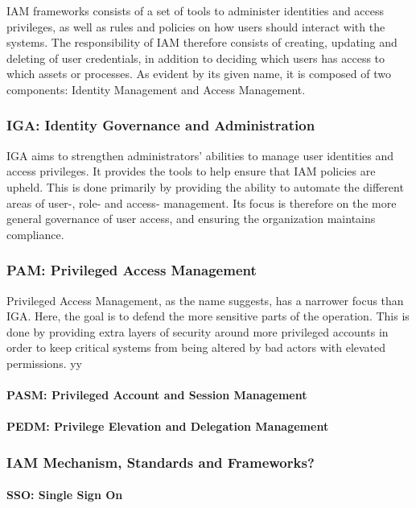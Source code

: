 IAM frameworks consists of a set of tools to administer identities and access privileges, as well as rules and policies on how users should interact with the systems. The responsibility of IAM therefore consists of creating, updating and deleting of user credentials, in addition to deciding which users has access to which assets or processes\citep{IAM-ComprehensiveStudy}. As evident by its given name, it is composed of two components: Identity Management and Access Management.

\subsubsection{IGA: Identity Governance and Administration}
IGA aims to strengthen administrators' abilities to manage user identities and access privileges. It provides the tools to help ensure that IAM policies are upheld\citep{StrongDM-IGAvsPAM,CoreSec-DiffIAMIGAPAM}. This is done primarily by providing the ability to automate the different areas of user-, role- and access- management. Its focus is therefore on the more general governance of user access, and ensuring the organization maintains compliance.

\subsubsection{PAM: Privileged Access Management}
Privileged Access Management, as the name suggests, has a narrower focus than IGA. Here, the goal is to defend the more sensitive parts of the operation\citep{StrongDM-IGAvsPAM,CoreSec-DiffIAMIGAPAM}. This is done by providing extra layers of security around more privileged accounts in order to keep critical systems from being altered by bad actors with elevated permissions. yy
\paragraph{PASM: Privileged Account and Session Management}
\paragraph{PEDM: Privilege Elevation and Delegation Management}

\subsubsection{IAM Mechanism, Standards and Frameworks?}
\paragraph{SSO: Single Sign On}
